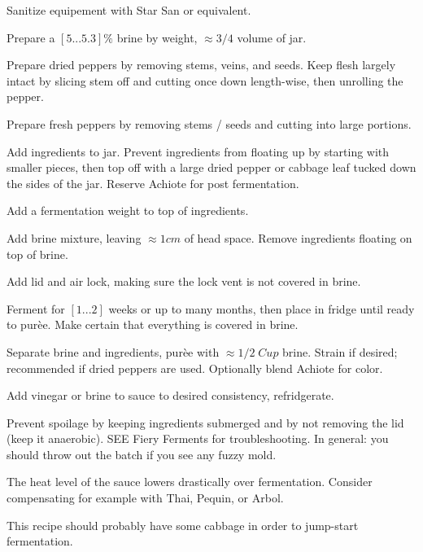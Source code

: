 \begin{preparation}
\item Sanitize equipement with Star San or equivalent.
\item Prepare a $[5...5.3]\%$ brine by weight, $\approx3/4$ volume of jar.
\item Prepare dried peppers by removing stems, veins, and seeds. Keep flesh largely intact by slicing stem off and cutting once down length-wise, then unrolling the pepper.
\item Prepare fresh peppers by removing stems / seeds and cutting into large portions.
\item Add ingredients to jar. Prevent ingredients from floating up by starting with smaller pieces, then top off with a large dried pepper or cabbage leaf tucked down the sides of the jar. Reserve Achiote for post fermentation.
\item Add a fermentation weight to top of ingredients.
\item Add brine mixture, leaving $\approx1cm$ of head space. Remove ingredients floating on top of brine.
\item Add lid and air lock, making sure the lock vent is not covered in brine.
\item Ferment for $[1...2]$ weeks or up to many months, then place in fridge until ready to pur\`{e}e. Make certain that everything is covered in brine.
\item Separate brine and ingredients, pur\`{e}e with $\approx1/2\;Cup$ brine. Strain if desired; recommended if dried peppers are used. Optionally blend Achiote for color.
\item Add vinegar or brine to sauce to desired consistency, refridgerate.
\end{preparation}

\begin{experiments}
\item Prevent spoilage by keeping ingredients submerged and by not removing the lid (keep it anaerobic). SEE Fiery Ferments for troubleshooting. In general: you should throw out the batch if you see any fuzzy mold.
\item The heat level of the sauce lowers drastically over fermentation. Consider compensating for example with Thai, Pequin, or Arbol.
\item This recipe should probably have some cabbage in order to jump-start fermentation.
\end{experiments}


\recipeend